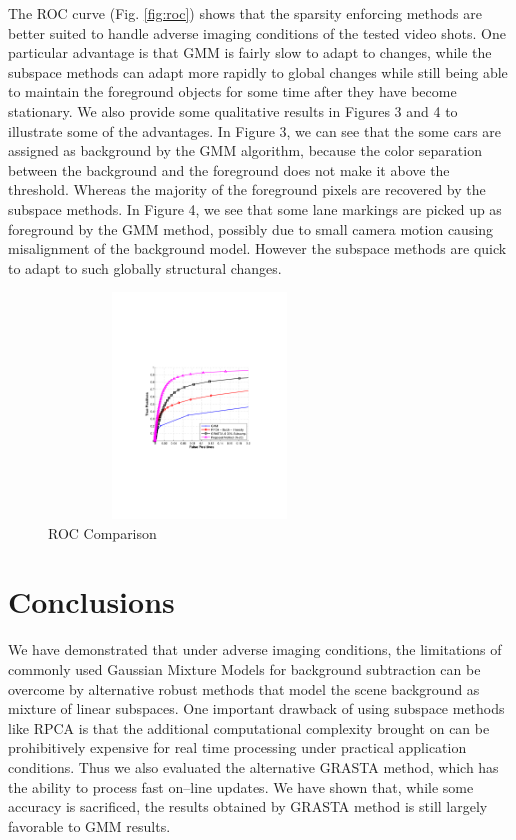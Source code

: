 \documentclass{article}
\begin{document}
The ROC curve (Fig. \ref{fig:roc}) shows that the sparsity enforcing methods are better suited to handle adverse imaging conditions of the tested video shots.  One particular advantage is that GMM is fairly slow to adapt to changes, while the subspace methods can adapt more rapidly to global changes while still being able to maintain the foreground objects for some time after they have become stationary. We also provide some qualitative results in Figures 3 and 4 to illustrate some of the advantages.  In Figure 3, we can see that the some cars are assigned as background by the GMM algorithm, because the color separation between the background and the foreground does not make it above the threshold.  Whereas the majority of the foreground pixels are recovered by the subspace methods.  In Figure 4, we see that some lane markings are picked up as foreground by the GMM method, possibly due to small camera motion causing misalignment of the background model.  However the subspace methods are quick to adapt to such globally structural changes.

\begin{figure}[htb]
\begin{minipage}[b]{\linewidth}
  \centering
  \centerline{\includegraphics[width=8cm, height = 6cm]{Imgs/ROC_comp_curve_zoom}}
\end{minipage}

\caption{\label{fig:roc}ROC Comparison}
\label{fig:rocComp}
\end{figure}

\section{Conclusions}
We have demonstrated that under adverse imaging conditions, the limitations of commonly used Gaussian Mixture Models for background subtraction can be overcome by alternative robust methods that model the scene background as mixture of linear subspaces.  One important drawback of using subspace methods like RPCA is that the additional computational complexity brought on can be prohibitively expensive for real time processing under practical application conditions.  Thus we also evaluated the alternative GRASTA method, which has the ability to process fast on--line updates.  We have shown that, while some accuracy is sacrificed, the results obtained by GRASTA method is still largely favorable to GMM results.
\end{document}
